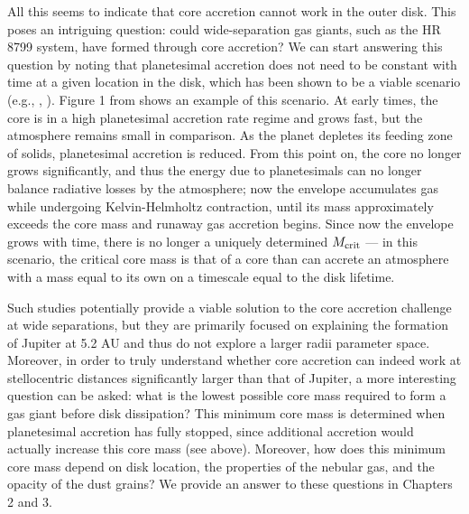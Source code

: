 All this seems to indicate that core accretion cannot work in the outer disk. This poses an intriguing question: could wide-separation gas giants, such as the HR 8799 system, have formed through core accretion? We can start answering this question by noting that planetesimal accretion does not need to be constant with time at a given location in the disk, which has been shown to be a viable scenario (e.g., \citealt{ikoma00}, \citealt{pollack96}). Figure 1 from \citet{pollack96} shows an example of this scenario. At early times, the core is in a high planetesimal accretion rate regime and grows fast, but the atmosphere remains small in comparison. As the planet depletes its feeding zone of solids, planetesimal accretion is reduced. From this point on, the core no longer grows significantly, and thus the energy due to planetesimals can no longer balance radiative losses by the atmosphere; now the envelope accumulates gas while undergoing Kelvin-Helmholtz contraction, until its mass approximately exceeds the core mass and runaway gas accretion begins. Since now the envelope grows with time, there is no longer a uniquely determined $M_{\rm crit}$ --- in this scenario, the critical core mass is that of a core than can accrete an atmosphere with a mass equal to its own on a timescale equal to the disk lifetime. 


Such studies potentially provide a viable solution to the core accretion challenge at wide separations, but they are primarily focused on explaining the formation of Jupiter at 5.2 AU and thus do not explore a larger radii parameter space. Moreover, in order to truly understand whether core accretion can indeed work at stellocentric distances significantly larger than that of Jupiter, a more interesting question can be asked: what is the lowest possible core mass required to form a gas giant before disk dissipation? This minimum core mass is determined when planetesimal accretion has fully stopped, since additional accretion would actually increase this core mass (see above). Moreover, how does this minimum core mass depend on disk location, the properties of the nebular gas, and the opacity of the dust grains? We provide an answer to these questions in Chapters 2 and 3. 



